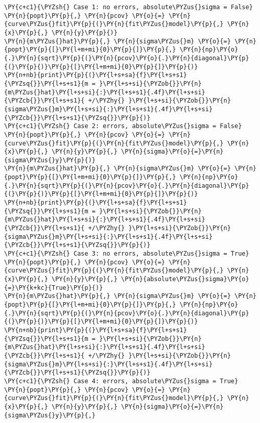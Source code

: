 \begin{Verbatim}[label=\makebox{\href{https://bitbucket.org/lbaldini/statnotes/src/master/snippets/absolute\_sigma.py}{https://bitbucket.org/.../absolute\_sigma.py}},commandchars=\\\{\}]
\PY{c+c1}{\PYZsh{} Case 1: no errors, absolute\PYZus{}sigma = False}
\PY{n}{popt}\PY{p}{,} \PY{n}{pcov} \PY{o}{=} \PY{n}{curve\PYZus{}fit}\PY{p}{(}\PY{n}{fit\PYZus{}model}\PY{p}{,} \PY{n}{x}\PY{p}{,} \PY{n}{y}\PY{p}{)}
\PY{n}{m\PYZus{}hat}\PY{p}{,} \PY{n}{sigma\PYZus{}m} \PY{o}{=} \PY{n}{popt}\PY{p}{[}\PY{l+m+mi}{0}\PY{p}{]}\PY{p}{,} \PY{n}{np}\PY{o}{.}\PY{n}{sqrt}\PY{p}{(}\PY{n}{pcov}\PY{o}{.}\PY{n}{diagonal}\PY{p}{(}\PY{p}{)}\PY{p}{[}\PY{l+m+mi}{0}\PY{p}{]}\PY{p}{)}
\PY{n+nb}{print}\PY{p}{(}\PY{l+s+sa}{f}\PY{l+s+s1}{\PYZsq{}}\PY{l+s+s1}{m = }\PY{l+s+si}{\PYZob{}}\PY{n}{m\PYZus{}hat}\PY{l+s+si}{:}\PY{l+s+s1}{.4f}\PY{l+s+si}{\PYZcb{}}\PY{l+s+s1}{ +/\PYZhy{} }\PY{l+s+si}{\PYZob{}}\PY{n}{sigma\PYZus{}m}\PY{l+s+si}{:}\PY{l+s+s1}{.4f}\PY{l+s+si}{\PYZcb{}}\PY{l+s+s1}{\PYZsq{}}\PY{p}{)}
\PY{c+c1}{\PYZsh{} Case 2: errors, absolute\PYZus{}sigma = False}
\PY{n}{popt}\PY{p}{,} \PY{n}{pcov} \PY{o}{=} \PY{n}{curve\PYZus{}fit}\PY{p}{(}\PY{n}{fit\PYZus{}model}\PY{p}{,} \PY{n}{x}\PY{p}{,} \PY{n}{y}\PY{p}{,} \PY{n}{sigma}\PY{o}{=}\PY{n}{sigma\PYZus{}y}\PY{p}{)}
\PY{n}{m\PYZus{}hat}\PY{p}{,} \PY{n}{sigma\PYZus{}m} \PY{o}{=} \PY{n}{popt}\PY{p}{[}\PY{l+m+mi}{0}\PY{p}{]}\PY{p}{,} \PY{n}{np}\PY{o}{.}\PY{n}{sqrt}\PY{p}{(}\PY{n}{pcov}\PY{o}{.}\PY{n}{diagonal}\PY{p}{(}\PY{p}{)}\PY{p}{[}\PY{l+m+mi}{0}\PY{p}{]}\PY{p}{)}
\PY{n+nb}{print}\PY{p}{(}\PY{l+s+sa}{f}\PY{l+s+s1}{\PYZsq{}}\PY{l+s+s1}{m = }\PY{l+s+si}{\PYZob{}}\PY{n}{m\PYZus{}hat}\PY{l+s+si}{:}\PY{l+s+s1}{.4f}\PY{l+s+si}{\PYZcb{}}\PY{l+s+s1}{ +/\PYZhy{} }\PY{l+s+si}{\PYZob{}}\PY{n}{sigma\PYZus{}m}\PY{l+s+si}{:}\PY{l+s+s1}{.4f}\PY{l+s+si}{\PYZcb{}}\PY{l+s+s1}{\PYZsq{}}\PY{p}{)}
\PY{c+c1}{\PYZsh{} Case 3: no errors, absolute\PYZus{}sigma = True}
\PY{n}{popt}\PY{p}{,} \PY{n}{pcov} \PY{o}{=} \PY{n}{curve\PYZus{}fit}\PY{p}{(}\PY{n}{fit\PYZus{}model}\PY{p}{,} \PY{n}{x}\PY{p}{,} \PY{n}{y}\PY{p}{,} \PY{n}{absolute\PYZus{}sigma}\PY{o}{=}\PY{k+kc}{True}\PY{p}{)}
\PY{n}{m\PYZus{}hat}\PY{p}{,} \PY{n}{sigma\PYZus{}m} \PY{o}{=} \PY{n}{popt}\PY{p}{[}\PY{l+m+mi}{0}\PY{p}{]}\PY{p}{,} \PY{n}{np}\PY{o}{.}\PY{n}{sqrt}\PY{p}{(}\PY{n}{pcov}\PY{o}{.}\PY{n}{diagonal}\PY{p}{(}\PY{p}{)}\PY{p}{[}\PY{l+m+mi}{0}\PY{p}{]}\PY{p}{)}
\PY{n+nb}{print}\PY{p}{(}\PY{l+s+sa}{f}\PY{l+s+s1}{\PYZsq{}}\PY{l+s+s1}{m = }\PY{l+s+si}{\PYZob{}}\PY{n}{m\PYZus{}hat}\PY{l+s+si}{:}\PY{l+s+s1}{.4f}\PY{l+s+si}{\PYZcb{}}\PY{l+s+s1}{ +/\PYZhy{} }\PY{l+s+si}{\PYZob{}}\PY{n}{sigma\PYZus{}m}\PY{l+s+si}{:}\PY{l+s+s1}{.4f}\PY{l+s+si}{\PYZcb{}}\PY{l+s+s1}{\PYZsq{}}\PY{p}{)}
\PY{c+c1}{\PYZsh{} Case 4: errors, absolute\PYZus{}sigma = True}
\PY{n}{popt}\PY{p}{,} \PY{n}{pcov} \PY{o}{=} \PY{n}{curve\PYZus{}fit}\PY{p}{(}\PY{n}{fit\PYZus{}model}\PY{p}{,} \PY{n}{x}\PY{p}{,} \PY{n}{y}\PY{p}{,} \PY{n}{sigma}\PY{o}{=}\PY{n}{sigma\PYZus{}y}\PY{p}{,}

\end{Verbatim}
